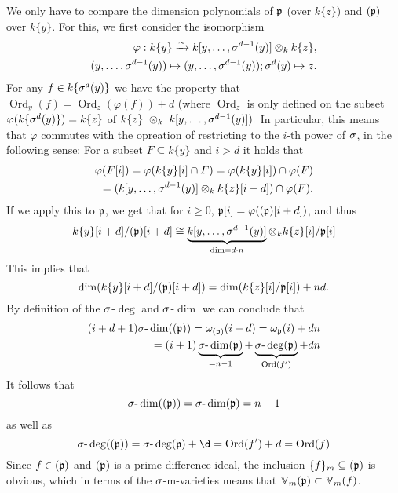 \begin{cor}
\begin{bew}
We only have to compare the dimension polynomials of $\mathfrak{p}$ (over $k\{z\}$) and $(\mathfrak{p})$ over $k\{y\}$.
For this, we first consider the isomorphism
\begin{align*} \varphi: k\{y\} \xrightarrow{\sim} k[y,\ldots,\sigma^{d-1}(y)] \otimes_k k\{z\}, \\ (y,\ldots,\sigma^{d-1}(y)) \mapsto (y,\ldots,\sigma^{d-1}(y)); \sigma^d(y) \mapsto z. \end{align*}
For any $f \in k\{\sigma^{d}(y)\}$ we have the property that $\operatorname{Ord}_y(f) = \operatorname{Ord}_z(\varphi(f)) + d$ (where $\operatorname{Ord}_z$ is only defined on the subset $\varphi(k\{\sigma^d(y)\}) = k\{z\}$ of $k\{z\}~\otimes_k~k[y,\ldots,\sigma^{d-1}(y)]).$
In particular, this means that $\varphi$ commutes with the opreation of restricting to the $i$-th power of $\sigma$, in the following sense:
For a subset $F \subseteq k\{y\}$ and $i > d$ it holds that
\begin{align*} \varphi(F[i]) = \varphi(k\{y\}[i] \cap F) = \varphi(k\{y\}[i]) \cap \varphi(F) \\
 = (k[y,\ldots,\sigma^{d-1}(y)] \otimes_k k\{z\}[i-d]) \cap \varphi(F) .\end{align*}
If we apply this to $\mathfrak{p}$, we get that for $i\geq 0$, $\mathfrak{p}[i] = \varphi((\mathfrak{p})[i+d])$, and thus 
$$ k\{y\}[i+d]/(\mathfrak{p})[i+d] \cong \underbrace{k[y,\ldots,\sigma^{d-1}(y)]}_{ \text{dim} = d \cdot n} \otimes_k k\{z\}[i]/\mathfrak{p}[i]$$
This implies that 
$$\operatorname{dim}(k\{y\}[i+d]/(\mathfrak{p})[i+d]) = \operatorname{dim}(k\{z\}[i]/\mathfrak{p}[i]) + nd.$$
By definition of the $\sigma$-$\operatorname{deg}$ and $\sigma$-$\operatorname{dim}$ we can conclude that 
\begin{align*}
(i+d+1) \sigma\text{-}\operatorname{dim}( (\mathfrak{p}) ) = \omega_{(\mathfrak{p})}(i+d) = \omega_{\mathfrak{p}}(i) + dn \\
= (i+1) \underbrace{\sigma\text{-}\operatorname{dim}(\mathfrak{p})}_{ = n - 1} + \underbrace{\sigma\text{-}\operatorname{deg}(\mathfrak{p})}_{\operatorname{Ord}(f')} + dn
\end{align*}
It follows that 
$$\sigma\text{-}\operatorname{dim}((\mathfrak{p}))= \sigma\text{-}\operatorname{dim}(\mathfrak{p}) = n-1 $$
as well as
$$\s\text{-}\operatorname{deg}((\p))= \s\text{-}\operatorname{deg}(\p) + \d = \operatorname{Ord}(f') + d = \operatorname{Ord}(f)$$
Since $f \in (\mathfrak{p})$ and $(\mathfrak{p})$ is a prime difference ideal, the inclusion $\{f\}_m \subseteq (\mathfrak{p})$ is obvious, which in terms of the $\sigma$-m-varieties means that $\mathbb{V}_m(\mathfrak{p}) \subset \mathbb{V}_m(f)$. 

\end{bew}
\end{cor}

